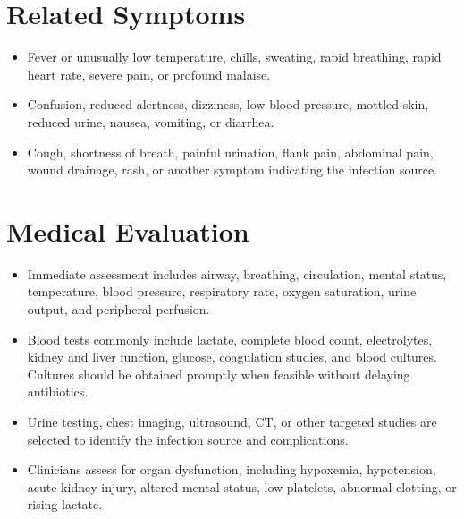 \section*{Related Symptoms}
\begin{itemize}
  \item Fever or unusually low temperature, chills, sweating, rapid breathing, rapid heart rate, severe pain, or profound malaise.
  \item Confusion, reduced alertness, dizziness, low blood pressure, mottled skin, reduced urine, nausea, vomiting, or diarrhea.
  \item Cough, shortness of breath, painful urination, flank pain, abdominal pain, wound drainage, rash, or another symptom indicating the infection source.
\end{itemize}

\section*{Medical Evaluation}
\begin{itemize}
  \item Immediate assessment includes airway, breathing, circulation, mental status, temperature, blood pressure, respiratory rate, oxygen saturation, urine output, and peripheral perfusion.
  \item Blood tests commonly include lactate, complete blood count, electrolytes, kidney and liver function, glucose, coagulation studies, and blood cultures. Cultures should be obtained promptly when feasible without delaying antibiotics.
  \item Urine testing, chest imaging, ultrasound, CT, or other targeted studies are selected to identify the infection source and complications.
  \item Clinicians assess for organ dysfunction, including hypoxemia, hypotension, acute kidney injury, altered mental status, low platelets, abnormal clotting, or rising lactate.
\end{itemize}

